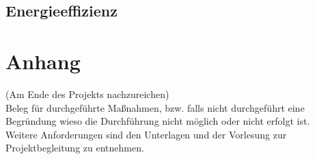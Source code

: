 \documentclass[accentcolor=tud0b,12pt,paper=a4]{tudreport}
\begin{document}
        \section{Energieeffizienz}
	        
	
\appendix	
	\chapter{Anhang}
		(Am Ende des Projekts nachzureichen)\\
		Beleg für durchgeführte Maßnahmen, bzw. falls nicht durchgeführt eine Begründung wieso die Durchführung nicht möglich oder nicht erfolgt ist. \\
		Weitere Anforderungen sind den Unterlagen und der Vorlesung zur Projektbegleitung zu entnehmen.
	
\end{document}

